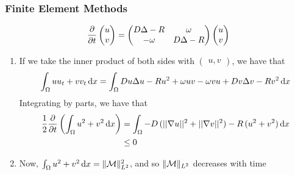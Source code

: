 \begin{frame}
\frametitle{Finite Element Methods}
\vspace{-0.5cm}
\begin{align*}
    \frac{\partial }{\partial t}
    \begin{pmatrix} u \\ v \end{pmatrix}
    = \begin{pmatrix}
    D \mbox{$\Delta$}{} - R & \omega \\ 
    -\omega & D \mbox{$\Delta$}{} - R
    \end{pmatrix}
    \begin{pmatrix} u \\ v \end{pmatrix}
\end{align*}
\vspace{-0.25cm}
\begin{enumerate}
    \item If we take the inner product of both sides with $\begin{pmatrix} u, v \end{pmatrix}$, we have that
    $$ \int_\Omega u u_t + v v_t \operatorname{d}\!{x} = \int_\Omega D u \mbox{$\Delta$}{u} - R u^2 + \omega u v - \omega v u + D v \mbox{$\Delta$}{v} - R v^2 \operatorname{d}\!{x} $$
    Integrating by parts, we have that
    \begin{align*}
    \frac{1}{2} \frac{\partial }{\partial t} \left( \int_\Omega u^2 + v^2 \operatorname{d}\!{x} \right) &= \int_\Omega -D \, (||\nabla u||^2 + ||\nabla v||^2) - R \, (u^2 + v^2) \operatorname{d}\!{x} \\ &\leq 0
    \end{align*}
    \item Now, $\int_\Omega u^2 + v^2 \operatorname{d}\!{x} = \lVert \mathcal{M} \rVert_{L^2}^2$, and so $\lVert \mathcal{M} \rVert_{L^2}$ decreases with time
\end{enumerate}
\end{frame}

